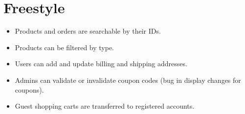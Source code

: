 \section{Freestyle}

\begin{itemize}
    \item Products and orders are searchable by their IDs.
    \item Products can be filtered by type.
    \item Users can add and update billing and shipping addresses.
    \item Admins can validate or invalidate coupon codes (bug in display changes for coupons).
    \item Guest shopping carts are transferred to registered accounts.
\end{itemize}
